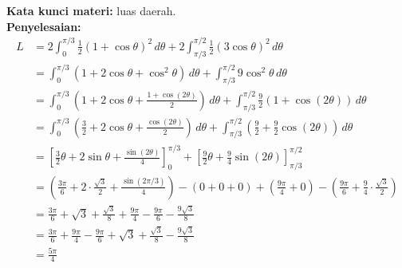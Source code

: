 \documentclass[10pt,openany,a4paper]{article}
\theoremstyle{definition}
\theoremstyle{definition}
\theoremstyle{plain}
\newenvironment{jawab}[2][tes]{
\textbf{Kata kunci materi:} #1.\\
\textbf{Penyelesaian:} #2
}{}
\begin{document}
\begin{enumerate}
\begin{jawab}[luas daerah]
{            \begin{align*}
L &= 2\int_0^{\pi/3} \frac{1}{2}(1+\cos \theta)^2 \, d\theta + 2\int_{\pi/3}^{\pi/2} \frac{1}{2}(3\cos \theta)^2 \, d\theta\\
&= \int_0^{\pi/3} (1 + 2\cos \theta + \cos^2 \theta) \, d\theta + \int_{\pi/3}^{\pi/2} 9\cos^2 \theta \, d\theta\\
&= \int_0^{\pi/3} \left(1 + 2\cos \theta + \frac{1 + \cos(2\theta)}{2}\right) \, d\theta + \int_{\pi/3}^{\pi/2} \frac{9}{2}(1 + \cos(2\theta)) \, d\theta\\
&= \int_0^{\pi/3} \left(\frac{3}{2} + 2\cos \theta + \frac{\cos(2\theta)}{2}\right  ) \, d\theta + \int_{\pi/3}^{\pi/2} \left(\frac{9}{2} + \frac{9}{2}\cos(2\theta)\right) \, d\theta\\
&= \left[\frac{3}{2}\theta + 2\sin \theta + \frac{\sin(2\theta)}{4}\right]_0^{\pi/3} + \left[\frac{9}{2}\theta + \frac{9}{4}\sin(2\theta)\right]_{\pi/3}^{\pi/2}\\
&= \left(\frac{3\pi}{6} + 2\cdot \frac{\sqrt{3}}{2} + \frac{\sin(2\pi/3)}{4}\right) - \left(0 + 0 + 0\right) + \left(\frac{9\pi}{4} + 0\right) - \left(\frac{9\pi}{6} + \frac{9}{4}\cdot \frac{\sqrt{3}}{2}\right)\\
&= \frac{3\pi}{6} + \sqrt{3} + \frac{\sqrt{3}}{8} + \frac{9\pi}{4} - \frac{9\pi}{6} - \frac{9\sqrt{3}}{8}\\
&= \frac{3\pi}{6} + \frac{9\pi}{4} - \frac{9\pi}{6} + \sqrt{3} + \frac{\sqrt{3}}{8} - \frac{9\sqrt{3}}{8}\\
&= \frac{5\pi}{4}
\end{align*}
            }


\end{jawab}
\end{enumerate}
\end{document}
